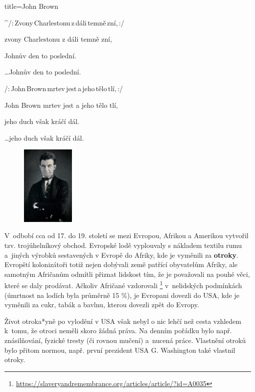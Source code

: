 \begin{song}{title=\predtitle \centering John Brown \\\large  }
{\begin{centerjustified}
\begin{varwidth}[t]{0.55\textwidth}
\sloka
^{}/:\,Zvony\,Charlestonu\,z\,dáli\,temně\,zní,\,:/

zvony Charlestonu z dáli temně zní,

Johnův den to poslední.

\dots  Johnův den to poslední.

\sloka
/:\,John\,Brown\,mrtev\,jest\,a\,jeho\,tělo\,tlí,\,:/

John Brown mrtev jest a jeho tělo tlí,

jeho duch však kráčí dál.

\dots  jeho duch však kráčí dál.

\end{varwidth}
\end{centerjustified}

\hrulefill

\begin{minipage}{\textwidth}

\begin{figure}
\centering
\includegraphics[width=0.23\textwidth]{../img/JohnBrown.jpg}
\end{figure}

\begin{small}
V~odbobí cca od 17. do 19. století se mezi Evropou, Afrikou a Amerikou vytvořil
tzv. trojúhelníkový obchod. Evropské lodě vyplouvaly s nákladem textilu rumu a~jiných
výrobků sestavených v Evropě do Afriky, kde je vyměnili za \textbf{otroky}.
Evropští kolonizátoři totiž nejen dobývali země patřící obyvatelům Afriky, ale samotným Afričanům
odmítli přiznat lidskost tím, že je považovali na pouhé věci, které se daly prodávat.
Ačkoliv Afričané vzdorovali \footnote{\url{https://slaveryandremembrance.org/articles/article/?id=A0035}}
v~nelidských podmínkách (úmrtnost na lodích byla průměrně 15 \%), je Evropani dovezli do
USA, kde je vyměnili za cukr, tabák a bavlnu, kterou dovezli zpět do Evropy.

Život otroka*yně po vylodění v USA však nebyl o nic lehčí než cesta vzhledem
k~tomu, že otroci neměli skoro žádná práva. Na denním pořádku bylo např.
znásilňování, fyzické tresty (či rovnou mučení) a~nucená práce. Vlastnění
otroků bylo přitom normou, např. první prezident USA G. Washington také vlastnil
otroky.


\end{small}
\end{minipage}}
\end{song}
